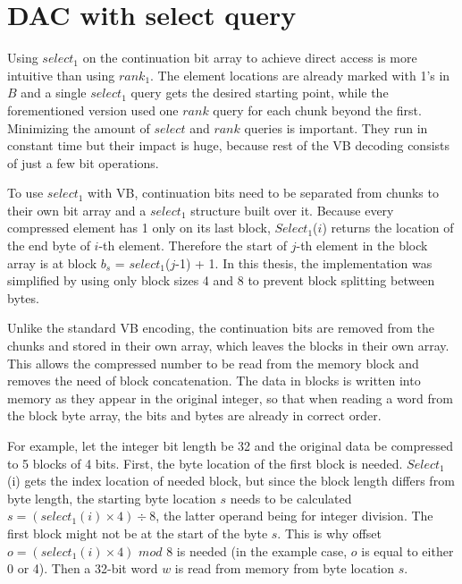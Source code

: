 \chapter{DAC with select query}
\label{chap:select_impl}
Using $select_1$ on the continuation bit array to achieve direct access is more intuitive than using $rank_1$. The element locations are already marked with 1's 
in $B$ and a single $select_1$ query gets the desired starting point, while the forementioned version \citep{Bri09} used one $rank$ query for each chunk beyond 
the first. Minimizing the amount of $select$ and $rank$ queries is important. They run in constant time but their impact is huge, because rest of the VB decoding 
consists of just a few bit operations. 

To use $select_1$ with VB, continuation bits need to be separated from chunks to their own bit array and a $select_1$ structure built over it. Because every compressed element has 1
only on its last block, $Select_1$($i$) returns the location of the end byte of $i$-th element. Therefore the start of  $j$-th element in the block array is at 
block $b_s$ = $select_1$($j$-1) + 1. In this thesis, the implementation was simplified by using only block sizes 4 and 8 to prevent block splitting between bytes.

Unlike the standard VB encoding, the continuation bits are removed from the chunks and stored in their own array, which leaves the blocks in their own array. This allows the 
compressed number to be read from the memory block and removes the need of block concatenation. The data in blocks is written into memory as they appear in the original integer, so that 
when reading a word from the block byte array, the bits and bytes are already in correct order. 

For example, let the integer bit length be 32 and the original data be compressed to 5 blocks of 4 bits. First, the byte location of the first block is needed. $Select_1$(i) gets the index location
of needed block, but since the block length differs from byte length, the starting byte location $s$ needs to be calculated $s = (select_1(i) \times 4) \div 8$, the latter operand being for integer division.
The first block might not be at the start of the byte $s$. This is why offset $o = (select_1(i) \times 4)$ $mod$ $8$ is needed (in the example case, $o$ is equal to either 0 or 4). Then a 32-bit word $w$ is read from memory from byte location $s$. 

